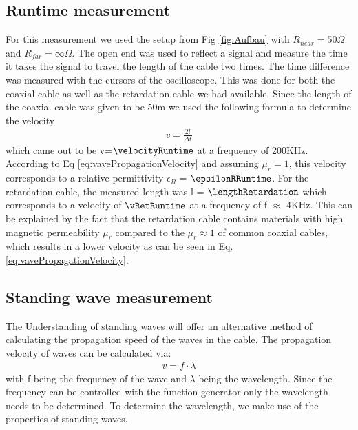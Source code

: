 \documentclass[a4paper,10pt,twocolumn]{article}
\begin{document}
    \subsection{Runtime measurement}
    \label{subsec:runtimeMeasurement}
    For this measurement we used the setup from Fig \ref{fig:Aufbau} with $R_{near}=50\Omega$ and $R_{far}=\infty \Omega $.
    The open end was used to reflect a signal and measure the time it takes the signal to travel the length of the cable two times.
    The time difference was measured with the cursors of the oscilloscope.
    This was done for both the coaxial cable as well as the retardation cable we had available.
    Since the length of the  coaxial cable was given to be 50m we used the following formula to determine the velocity
    \begin{align}
        \label{eq:runtimeVelocity}
        v=\frac{2l}{\Delta t}
        \end{align}
    which came out to be v=$\velocityRuntime$ at a frequency of 200KHz.
    According to Eq \ref{eq:vavePropagationVelocity} and assuming $\mu_r = 1$, this velocity corresponds to a relative permittivity $\epsilon_R$ = $\epsilonRRuntime$.
    \endline
    For the retardation cable, the measured length was l = $\lengthRetardation$ which corresponds to a velocity of $\vRetRuntime$ at a frequency of f $\approx$ 4KHz.
    This can be explained by the fact that the retardation cable contains materials with high magnetic permeability $\mu_r$ compared to the $\mu_r \approx 1 $ of common coaxial cables, which results in a lower velocity as can be seen in Eq. \ref{eq:vavePropagationVelocity}.
    \subsection{Standing wave measurement}
    \label{subsec:standingWaveMeasurement}
    The Understanding of standing waves will offer an alternative method of  calculating the propagation speed of the waves in the cable.
    The propagation velocity of waves can be calculated via:
    \begin{align}
        \label{eq:velocityStanding}
        v = f\cdot\lambda
        \end{align}
    with f being the frequency of the wave and $\lambda$ being the wavelength.
    Since the frequency can be controlled with the function generator only the wavelength needs to be determined.
    To determine the wavelength, we make use of the properties of standing waves. 
\end{document}
